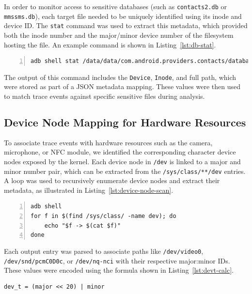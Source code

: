 \documentclass[a4paper,12pt]{report}
\begin{document}
In order to monitor access to sensitive databases (such as \texttt{contacts2.db} or \texttt{mmssms.db}), each target file needed to be uniquely identified using its inode and device ID. The \texttt{stat} command was used to extract this metadata, which provided both the inode number and the major/minor device number of the filesystem hosting the file. An example command is shown in Listing~\ref{lst:db-stat}.

\begin{lstlisting}[language=sh,caption={Retrieving inode and device ID for a database file},label={lst:db-stat},numbers=left]
adb shell stat /data/data/com.android.providers.contacts/databases/contacts2.db
\end{lstlisting}

The output of this command includes the \texttt{Device}, \texttt{Inode}, and full path, which were stored as part of a JSON metadata mapping. These values were then used to match trace events against specific sensitive files during analysis.

\subsection{Device Node Mapping for Hardware Resources}

To associate trace events with hardware resources such as the camera, microphone, or NFC module, we identified the corresponding character device nodes exposed by the kernel. Each device node in \texttt{/dev} is linked to a major and minor number pair, which can be extracted from the \texttt{/sys/class/**/dev} entries. A loop was used to recursively enumerate device nodes and extract their metadata, as illustrated in Listing~\ref{lst:device-node-scan}.

\begin{lstlisting}[caption={Enumerating character and block devices with major:minor IDs},label={lst:device-node-scan},numbers=left]
adb shell
for f in $(find /sys/class/ -name dev); do
    echo "$f -> $(cat $f)"
done
\end{lstlisting}

Each output entry was parsed to associate paths like \texttt{/dev/video0}, \texttt{/dev/snd/pcmC0D0c}, or \texttt{/dev/nq-nci} with their respective major:minor IDs. These values were encoded using the formula shown in Listing~\ref{lst:devt-calc}.

\begin{lstlisting}[caption={Encoding device number using major and minor},label={lst:devt-calc},numbers=none]
dev_t = (major << 20) | minor
\end{lstlisting}
\end{document}

